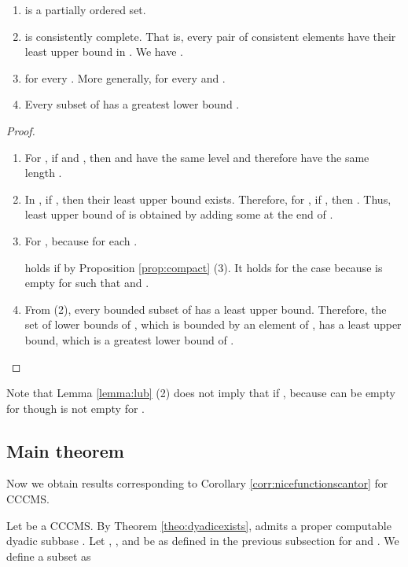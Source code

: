 \documentclass{eptcs-modified}
\begin{document}
\begin{lemma}\label{lemma:lub}
\begin{enumerate}
\item    is a partially ordered set.

\item    is consistently complete.  That is, every pair  of consistent elements have
  their least upper bound  in .  We have .

\item   for every .
  More generally,
 for every  and .

\item  Every subset  of  has a greatest lower bound .
\end{enumerate}
\begin{proof}
\begin{enumerate}
\item  For ,  if   and ,
then  and  have the same level  and therefore
have the same length .

\item In , if , then their least upper bound  exists.   Therefore, for ,
   if , then
   .
   Thus, least upper bound  of  is obtained by adding some
    at the end of .

\item For ,
 because  for each .

holds if  by Proposition \ref{prop:compact} (3).
It holds for the case  because
 is empty for  such that  and .

\item From (2), every bounded subset of  has a least upper bound.
   Therefore, the set of lower bounds of , which is bounded by an element of , has a least upper bound, which is a greatest lower bound of .
 \end{enumerate}
\end{proof}
\end{lemma}

Note that Lemma \ref{lemma:lub} (2) does not imply that
 if ,
because
 can be empty for  though  is not empty for .

\subsection{Main theorem}

Now we obtain results corresponding to Corollary \ref{corr:nicefunctionscantor}  for CCCMS.


Let  be a CCCMS.
By Theorem \ref{theo:dyadicexists},  admits a proper computable dyadic subbase .  Let , , 
and  be as defined in the previous subsection for  and .
We define a subset  as
\end{document}

